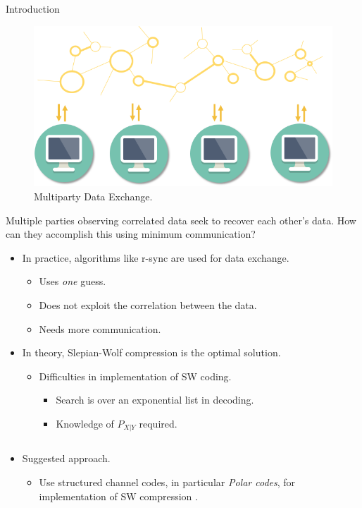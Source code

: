 \documentclass[final,hyperref={pdfpagelabels=false}]{beamer}
\begin{document}
\begin{frame}[t]
\begin{columns}[t]
\begin{column}{.465\textwidth}
\begin{block}{Introduction}
\begin{figure}
\includegraphics[width=0.8\linewidth]{multiparty.png}
\caption{Multiparty Data Exchange.}
\end{figure}
Multiple parties observing correlated data seek to recover each other's data. How can they accomplish this using minimum communication?
\begin{itemize}
\item In practice, algorithms like r-sync are used for data exchange.
\begin{itemize}
\item Uses \emph{one} guess.
\item Does not exploit the correlation between the data.
\item Needs more communication.
\end{itemize}
\item In theory, Slepian-Wolf compression is the optimal solution.
\begin{itemize}
\item Difficulties in implementation of SW coding.
\begin{itemize}
\item Search is over an exponential list in decoding.
\item Knowledge of $P_{X|Y}$ required. 
\end{itemize}
\end{itemize}
\end{itemize}
\begin{columns} %
\begin{column}{.5\textwidth} %
\begin{itemize}
\item Suggested approach.
\begin{itemize}
\item Use structured channel codes, in particular \emph{Polar codes}, for implementation of SW compression \cite{PCSW}.

\end{itemize}
\end{itemize}
\end{column}
\end{columns}
\end{block}
\end{column}
\end{columns}
\end{frame}
\end{document}
